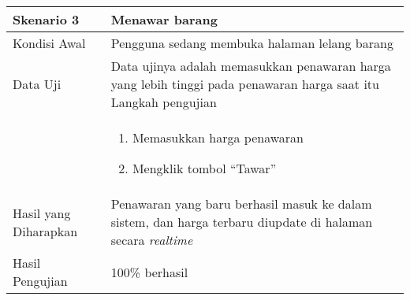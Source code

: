 \begin{longtable}{|X|X|}
		
	\textbf{Skenario 3}
		& Menawar barang \\ \hline
	Kondisi Awal
		& Pengguna sedang membuka halaman lelang barang \\ \hline
	Data Uji
		& Data ujinya adalah memasukkan penawaran harga yang lebih tinggi pada penawaran harga saat itu
	Langkah pengujian \\ \hline
		& \begin{enumerate}
		\item Memasukkan harga penawaran
		\item Mengklik tombol ``Tawar''
	\end{enumerate} \\ \hline
	Hasil yang Diharapkan
		& Penawaran yang baru berhasil masuk ke dalam sistem, dan harga terbaru diupdate di halaman secara \textit{realtime} \\ \hline
	Hasil Pengujian
		& 100\% berhasil \\ \hline	
		
\end{longtable}